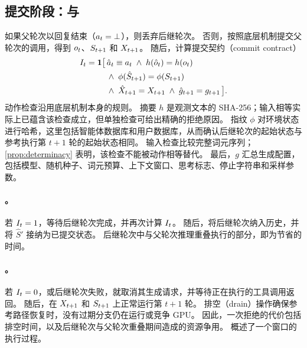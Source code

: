 \subsection{提交阶段：\stratCommit 与\stratRecover}
\label{sec:method:commit}

如果父轮次以回复结束（$a_{t}=\bot$），则丢弃后继轮次。
否则，按照底层机制提交父轮次的调用，得到 $o_{t}$、$S_{t+1}$ 和 $X_{t+1}$。
随后，\method 计算提交契约（commit contract）
\begin{equation}
\begin{aligned}
  I_t = \mathbf{1}\big[\,
    &\hat a_t\equiv a_{t} \;\wedge\; h(\hat o_t)=h(o_{t}) \\
    &\wedge\; \phi(\hat S_{t+1})=\phi(S_{t+1}) \\
    &\wedge\; \hat X_{t+1}=X_{t+1} \;\wedge\; \hat g_{t+1}=g_{t+1}\,\big].
\end{aligned}
\label{eq:contract}
\end{equation}
动作检查沿用底层机制本身的规则。
摘要 $h$ 是观测文本的 SHA-256；输入相等实际上已蕴含该检查成立，但单独检查可给出精确的拒绝原因。
指纹 $\phi$ 对环境状态进行哈希，这里包括智能体数据库和用户数据库，从而确认后继轮次的起始状态与参考执行第 $t{+}1$ 轮的起始状态相同。
输入检查比较完整词元序列；\cref{prop:determinacy} 表明，该检查不能被动作相等替代。
最后，$g$ 汇总生成配置，包括模型、随机种子、词元预算、上下文窗口、思考标志、停止字符串和采样参数。

\paragraph{\stratCommit。}
若 $I_t=1$，\method 等待后继轮次完成，并再次计算 $I_t$。
随后，将后继轮次纳入历史，并将 $\hat S'$ 接纳为已提交状态。
后继轮次中与父轮次推理重叠执行的部分，即为节省的时间。

\paragraph{\stratRecover。}
若 $I_t=0$，或后继轮次失败，\method 就取消其生成请求，并等待正在执行的工具调用返回。
随后，在 $X_{t+1}$ 和 $S_{t+1}$ 上正常运行第 $t{+}1$ 轮。
排空（drain）操作确保参考路径恢复时，没有过期分支仍在运行或竞争 GPU。
因此，一次拒绝的代价包括排空时间，以及后继轮次与父轮次重叠期间造成的资源争用。
 概述了一个窗口的执行过程。

